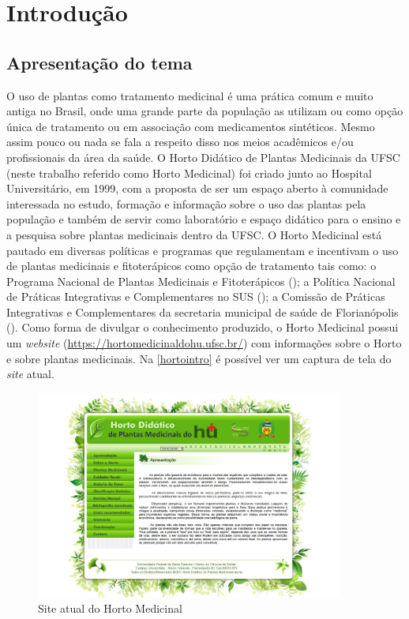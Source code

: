 \chapter{Introdução}\label{introducao}

\section{Apresentação do tema}\label{apresentacao-do-tema}

O uso de plantas como tratamento medicinal é uma prática comum e muito antiga no Brasil, onde uma grande parte da população as utilizam ou como opção única de tratamento ou em associação com medicamentos sintéticos. Mesmo assim pouco ou nada se fala a respeito disso nos meios acadêmicos e/ou profissionais da área da saúde. O Horto Didático de Plantas Medicinais da UFSC (neste trabalho referido como Horto Medicinal) foi criado junto ao Hospital Universitário, em 1999, com a proposta de ser um espaço aberto à comunidade interessada no estudo, formação e informação sobre o uso das plantas pela população e também de servir como laboratório e espaço didático para o ensino e a pesquisa sobre plantas medicinais dentro da UFSC. O Horto Medicinal está pautado em diversas políticas e programas que regulamentam e incentivam o uso de plantas medicinais e fitoterápicos como opção de tratamento tais como: o Programa Nacional de Plantas Medicinais e Fitoterápicos (\textcite{pnpmf}); a Política Nacional de Práticas Integrativas e Complementares no SUS (\textcite{pnpic06}); a Comissão de Práticas Integrativas e Complementares da secretaria municipal de saúde de Florianópolis (\textcite{picsc}). Como forma de divulgar o conhecimento produzido, o Horto Medicinal possui um \emph{website} (\url{https://hortomedicinaldohu.ufsc.br/}) com informações sobre o Horto e sobre plantas medicinais. Na \autoref{hortointro} é possível ver um captura de tela do \emph{site} atual.

\begin{figure}[!htbp]
\centering
\caption{\label{hortointro}Site atual do Horto Medicinal}
\includegraphics[width=0.9\textwidth]{images/drive/image_0.png}
\end{figure}


